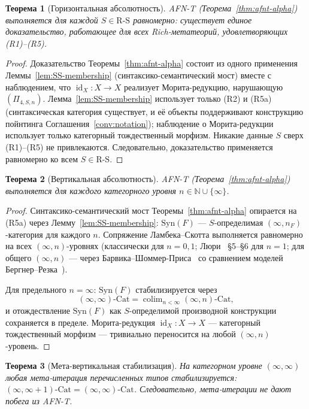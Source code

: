 \documentclass[11pt]{article}
\theoremstyle{plain}
\newtheorem{theorem}{Теорема}[section]
\theoremstyle{definition}
\newcommand{\RS}{\mathrm{R\text{-}S}}
\newcommand{\Cat}{\mathrm{Cat}}
\newcommand{\Syn}{\mathrm{Syn}}
\DeclareMathOperator{\colim}{colim}
\DeclareMathOperator{\id}{id}
\begin{document}
\begin{theorem}[Горизонтальная абсолютность]\label{thm:horizontal}
AFN-T (Теорема~\ref{thm:afnt-alpha}) выполняется для каждой $S \in \RS$ равномерно: существует единое доказательство, работающее для всех Rich-метатеорий, удовлетворяющих (R1)--(R5).
\end{theorem}

\begin{proof}
Доказательство Теоремы~\ref{thm:afnt-alpha} состоит из одного применения Леммы~\ref{lem:SS-membership} (синтаксико-семантический мост) вместе с наблюдением, что $\id_X : X \to X$ реализует Морита-редукцию, нарушающую $(\Pi_{4, S, n})$. Лемма~\ref{lem:SS-membership} использует только (R2) и (R5a) (синтаксическая категория существует, и её объекты поддерживают конструкцию пойнтинга Соглашения~\ref{conv:notation}); наблюдение о Морита-редукции использует только категорный тождественный морфизм. Никакие данные $S$ сверх (R1)--(R5) не привлекаются. Следовательно, доказательство применяется равномерно ко всем $S \in \RS$.
\end{proof}

\begin{theorem}[Вертикальная абсолютность]\label{thm:vertical}
AFN-T (Теорема~\ref{thm:afnt-alpha}) выполняется для каждого категорного уровня $n \in \mathbb{N} \cup \{\infty\}$.
\end{theorem}

\begin{proof}
Синтаксико-семантический мост Теоремы~\ref{thm:afnt-alpha} опирается на (R5a) через Лемму~\ref{lem:SS-membership}: $\Syn(F)$ — $S$-определимая $(\infty, n_F)$-категория для каждого $n$. Сопряжение Ламбека--Скотта выполняется равномерно на всех $(\infty, n)$-уровнях (классически для $n = 0, 1$; Люри~\cite{LurieHTT} \S 5--\S 6 для $n = 1$; для общего $(\infty, n)$ — через Барвика--Шоммер-Приса~\cite{BarwickSchommerPries2021} со сравнением моделей Бергнер--Резка~\cite{BergnerRezk2013}).

Для предельного $n = \infty$: $\Syn(F)$ стабилизируется через
\[ (\infty, \infty)\text{-}\Cat = \colim_{n < \infty} (\infty, n)\text{-}\Cat, \]
и отождествление $\Syn(F)$ как $S$-определимой производной конструкции сохраняется в пределе. Морита-редукция $\id_X : X \to X$ — категорный тождественный морфизм — тривиально переносится на любой $(\infty, n)$-уровень.
\end{proof}

\begin{theorem}[Мета-вертикальная стабилизация]\label{thm:meta-vertical}
На категорном уровне $(\infty, \infty)$ любая мета-итерация перечисленных типов стабилизируется: $(\infty, \infty + 1)\text{-}\Cat = (\infty, \infty)\text{-}\Cat$. Следовательно, мета-итерации не дают побега из AFN-T.
\end{theorem}
\end{document}
